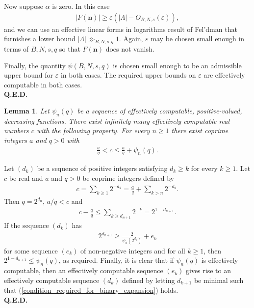 \documentclass[9pt]{amsart}
\theoremstyle{my_theorem_style}
\numberwithin{definition}{section}
\newtheorem{lemma}[definition]{Lemma}
\renewenvironment{proof}{\noindent {\textbf{Proof.}}}{\\\textbf{Q.E.D.}}
\newcommand{\eps}{\varepsilon}
\renewcommand{\vec}[1]{\bm{#1}}
\begin{document}
\begin{proof}
    Now suppose $\alpha$ is zero. In this case
    \begin{align*}
        |F(\vec{n})| \geq \eps(|\Lambda| - O_{B, N, s}(\eps)),
    \end{align*}
    and we can use an effective linear forms in logarithms result of Fel'dman \cite[Theorem 1]{Fel'dman_an_improvement_of_the_estimate_of_a_linear_form_in_the_logarithms_of_algebraic_numbers} that furnishes a lower bound $|\Lambda| \gg_{B, N, s, q} 1$. Again, $\eps$ may be chosen small enough in terms of $B, N, s, q$ so that $F(\vec{n})$ does not vanish.
    
    Finally, the quantity $\psi(B, N, s, q)$ is chosen small enough to be an admissible upper bound for $\eps$ in both cases. The required upper bounds on $\eps$ are effectively computable in both cases.
\end{proof}

\begin{lemma}
\label{existence_of_uncountably_many_c_and_effectively_computable_examples}
    Let $\psi_n(q)$ be a sequence of effectively computable, positive-valued, decreasing functions. There exist infinitely many effectively computable real numbers $c$ with the following property. For every $n \geq 1$ there exist coprime integers $a$ and $q > 0$ with
    \begin{align}
    \label{diophantine_approximation_property}
        \frac{a}{q} < c \leq \frac{a}{q} + \psi_n(q).
    \end{align}
\end{lemma}
\begin{proof}
    Let $(d_k)$ be a sequence of positive integers satisfying $d_k \geq k$ for every $k \geq 1$. Let $c$ be real and $a$ and $q > 0$ be coprime integers defined by
    \begin{align*}
        c = \sum_{k \geq 1} 2^{-d_k} = 
        \frac{a}{q} + \sum_{k > n} 2^{-d_k}.
    \end{align*}
    Then $q = 2^{d_n}$, $a/q < c$ and
    \begin{align*}
        c - \frac{a}{q} \leq \sum_{k \geq d_{n + 1}} 2^{-k} =
        2^{1 - d_{n + 1}}.
    \end{align*}
    If the sequence $(d_k)$ has 
    \begin{align}
    \label{condition_required_for_binary_expansion}
        2^{d_{k + 1}} \geq \frac{2}{\psi_k(2^{d_k})} + e_k
    \end{align}
    for some sequence $(e_k)$ of non-negative integers and for all $k \geq 1$, then $2^{1 - d_{n + 1}} \leq \psi_n(q)$, as required. Finally, it is clear that if $\psi_n(q)$ is effectively computable, then an effectively computable sequence $(e_k)$ gives rise to an effectively computable sequence $(d_k)$ defined by letting $d_{k + 1}$ be minimal such that (\ref{condition_required_for_binary_expansion}) holds.
\end{proof}
\end{document}
